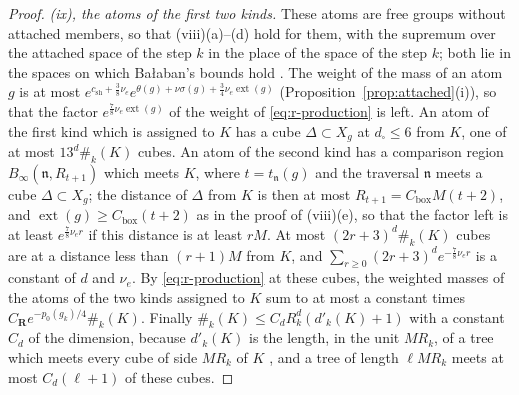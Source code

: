 \documentclass[11pt]{preprint}
\numberwithin{equation}{section}
\theoremstyle{definition}
\theoremstyle{remark}
\theoremstyle{plain}
\begin{document}
\begin{proof}
\emph{(ix), the atoms of the first two kinds.} These atoms are free groups without attached members, so that (viii)(a)--(d) hold for them, with the supremum over the attached space of the step $k$ in the place of the space of the step $k$; both lie in the spaces on which Ba{\l}aban's bounds hold \cite[(1.73)--(1.75), p.~380]{BalabanLFR2}. The weight of the mass of an atom $g$ is at most $e^{c_{\mathrm{sh}} + \frac38\nu_e}e^{\theta(g) + \nu\sigma(g) + \frac34\nu_e\operatorname{ext}(g)}$ (Proposition~\ref{prop:attached}(i)), so that the factor $e^{\frac78\nu_e\operatorname{ext}(g)}$ of the weight of \eqref{eq:r-production} is left. An atom of the first kind which is assigned to $K$ has a cube $\Delta \subset X_g$ at $d_\square \leq 6$ from $K$, one of at most $13^d\#_k(K)$ cubes. An atom of the second kind has a comparison region $B_\infty(\mathfrak n, R_{t+1})$ which meets $K$, where $t = t_{\mathfrak n}(g)$ and the traversal $\mathfrak n$ meets a cube $\Delta \subset X_g$; the distance of $\Delta$ from $K$ is then at most $R_{t+1} = C_{\mathrm{box}}M(t + 2)$, and $\operatorname{ext}(g) \geq C_{\mathrm{box}}(t + 2)$ as in the proof of (viii)(e), so that the factor left is at least $e^{\frac78\nu_er}$ if this distance is at least $rM$. At most $(2r + 3)^d\#_k(K)$ cubes are at a distance less than $(r + 1)M$ from $K$, and $\sum_{r \geq 0}(2r + 3)^de^{-\frac78\nu_er}$ is a constant of $d$ and $\nu_e$. By \eqref{eq:r-production} at these cubes, the weighted masses of the atoms of the two kinds assigned to $K$ sum to at most a constant times $C_{\mathbf R}e^{-p_0(g_k)/4}\#_k(K)$. Finally $\#_k(K) \leq C_dR_k^d(d'_k(K) + 1)$ with a constant $C_d$ of the dimension, because $d'_k(K)$ is the length, in the unit $MR_k$, of a tree which meets every cube of side $MR_k$ of $K$ \cite[p.~380]{BalabanLFR2}, and a tree of length $\ell MR_k$ meets at most $C_d(\ell + 1)$ of these cubes.


\end{proof}
\end{document}
